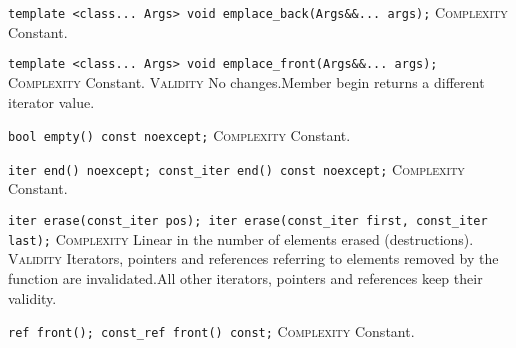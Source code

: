 \noindent{}\hspace*{0.25em}\lstinline[basicstyle=\ttfamily\color{cgreen}]{template <class... Args> void emplace_back(Args&&... args);} \textsc{Complexity} Constant.\\\vspace{-0.6em}

\noindent{}\hspace*{0.25em}\lstinline[basicstyle=\ttfamily\color{cgreen}]{template <class... Args> void emplace_front(Args&&... args);} \textsc{Complexity} Constant. \textsc{Validity} No changes.Member begin returns a different iterator value.\\\vspace{-0.6em}

\noindent{}\hspace*{0.25em}\lstinline[basicstyle=\ttfamily\color{cgreen}]{bool empty() const noexcept;} \textsc{Complexity} Constant.\\\vspace{-0.6em}

\noindent{}\hspace*{0.25em}\lstinline[basicstyle=\ttfamily\color{cgreen}]{iter end() noexcept; const_iter end() const noexcept;} \textsc{Complexity} Constant.\\\vspace{-0.6em}

\noindent{}\hspace*{0.25em}\lstinline[basicstyle=\ttfamily\color{corange}]{iter erase(const_iter pos); iter erase(const_iter first, const_iter last);} \textsc{Complexity} Linear in the number of elements erased (destructions). \textsc{Validity} Iterators, pointers and references referring to elements removed by the function are invalidated.All other iterators, pointers and references keep their validity.\\\vspace{-0.6em}

\noindent{}\hspace*{0.25em}\lstinline[basicstyle=\ttfamily\color{cgreen}]{ref front(); const_ref front() const;} \textsc{Complexity} Constant.\\\vspace{-0.6em}

